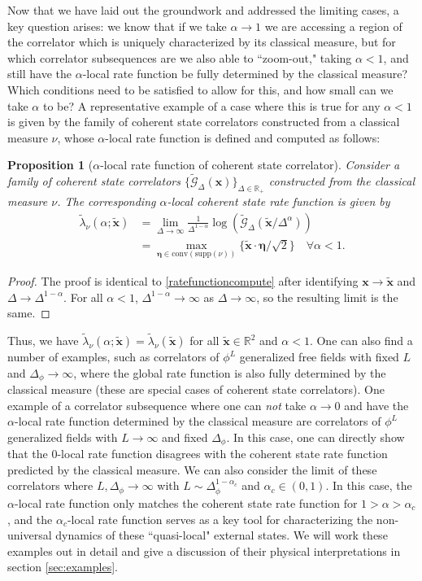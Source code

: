 \documentclass[a4paper,11pt]{article}
\theoremstyle{plain}
\newtheorem{prop}[thm]{Proposition}
\theoremstyle{definition}
\theoremstyle{remark}
\newcommand{\bs}[1]{\boldsymbol{#1}}
\newcommand{\ba}{\begin{equation} \begin{aligned}}
\newcommand{\ea}{\end{aligned} \end{equation}}
\newcommand{\Df}{\Delta_\phi}
\newcommand{\De}{\Delta}
\begin{document}
Now that we have laid out the groundwork and addressed the limiting cases, a key question arises: we know that if we take $\alpha \to 1$ we are accessing a region of the correlator which is uniquely characterized by its classical measure, but for which correlator subsequences are we also able to ``zoom-out," taking $\alpha<1$, and still have the $\alpha$-local rate function be fully determined by the classical measure? Which conditions need to be satisfied to allow for this, and how small can we take $\alpha$ to be? A representative example of a case where this is true for any $\alpha<1$ is given by the family of coherent state correlators constructed from a classical measure $\nu$, whose $\alpha$-local rate function is defined and computed as follows:

\begin{prop}[$\alpha$-local rate function of coherent state correlator]
Consider a family of coherent state correlators $\{\tilde{\mathcal{G}}_\De(\bs{x})\}_{\De\in\mathbb{R}_+}$ constructed from the classical measure $\nu$. The corresponding $\alpha$-local coherent state rate function is given by
\ba
\tilde{\lambda}_{\nu}(\alpha;\tilde{\bs{x}}) &= \lim_{\De \to \infty} \frac{1}{\De^{1-\alpha}} \log \left( \tilde{\mathcal{G}}_{\De}(\tilde{\bs{x}}/\De^\alpha) \right)\\ &= \max_{\bs{\eta} \in \mathrm{conv}(\mathrm{supp}(\nu))} \{\tilde{\bs{x}}\cdot \bs{\eta}/\sqrt{2} \} \quad \forall \alpha  <1.
\ea
\end{prop}
\begin{proof}
    The proof is identical to \ref{ratefunctioncompute} after identifying $\bs{x} \to \tilde{\bs{x}}$ and $\De \to \De^{1-\alpha}$. For all $\alpha < 1$, $\De^{1-\alpha} \to \infty$ as $\De\to\infty$, so the resulting limit is the same. 
\end{proof}
Thus, we have $\tilde{\lambda}_{\nu}(\alpha;\tilde{\bs{x}}) = \tilde{\lambda}_{\nu}(\tilde{\bs{x}})$ for all $\tilde{\bs{x}} \in \mathbb{R}^2$ and $\alpha <1$. One can also find a number of examples, such as correlators of $\phi^L$ generalized free fields with fixed $L$ and $\Df \to \infty$, where the global rate function is also fully determined by the classical measure (these are special cases of coherent state correlators). One example of a correlator subsequence where one can \textit{not} take $\alpha \to 0$ and have the $\alpha$-local rate function determined by the classical measure are correlators of $\phi^L$ generalized fields with $L\to\infty$ and fixed $\De_\phi$. In this case, one can directly show that the $0$-local rate function disagrees with the coherent state rate function predicted by the classical measure. We can also consider the limit of these correlators where $L,\Df \to\infty$ with $L \sim \Df^{1-\alpha_c}$ and $\alpha_c \in (0,1)$. In this case, the $\alpha$-local rate function only matches the coherent state rate function for $1>\alpha > \alpha_c$, and the $\alpha_c$-local rate function serves as a key tool for characterizing the non-universal dynamics of these ``quasi-local" external states. We will work these examples out in detail and give a discussion of their physical interpretations in section \ref{sec:examples}. 
\end{document}
